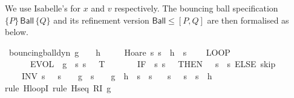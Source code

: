 \documentclass[envcountsame]{llncs}
\begin{document}
\begin{example}
We use Isabelle's  for $x$ and $v$ respectively. The bouncing ball specification $\{P\}\, \mathsf{Ball}\, \{Q\}$ and its refinement version $\mathsf{Ball}\leq [P,Q]$ are then formalised as below. 
\begin{isabellebody}
\isanewline
{}\isamarkupfalse%
\ bouncing{\isacharunderscore}ball{\isacharunderscore}dyn{\isacharcolon}\ {\isachardoublequoteopen}g\ {\isacharless}\ {}\ {\isasymLongrightarrow}\ h\ {\isasymge}\ {}\ {\isasymLongrightarrow}\isanewline
\ \ Hoare\ {\isasymlceil}{\isasymlambda}s{\isachardot}\ s{\isachardollar}{}\ {\isacharequal}\ h\ {\isasymand}\ s{\isachardollar}{}\ {\isacharequal}\ {}{\isasymrceil}\isanewline
\ \ {\isacharparenleft}LOOP\ \isanewline
\ \ \ \ \ \ {\isacharparenleft}{\isacharparenleft}EVOL\ {\isacharparenleft}{\isasymphi}\ g{\isacharparenright}\ {\isacharparenleft}{\isasymlambda}\ s{\isachardot}\ s{\isachardollar}{}\ {\isasymge}\ {}{\isacharparenright}\ T{\isacharparenright}{\isacharsemicolon}\isanewline
\ \ \ \ \ \ \ {\isacharparenleft}IF\ {\isacharparenleft}{\isasymlambda}\ s{\isachardot}\ s{\isachardollar}{}\ {\isacharequal}\ {}{\isacharparenright}\ THEN\ {\isacharparenleft}{}\ {\isacharcolon}{\isacharcolon}{\isacharequal}\ {\isacharparenleft}{\isasymlambda}s{\isachardot}\ {\isacharminus}\ s{\isachardollar}{}{\isacharparenright}{\isacharparenright}\ ELSE\ skip{\isacharparenright}{\isacharparenright}\ \isanewline
\ \ \ \ INV\ {\isacharparenleft}{\isasymlambda}s{\isachardot}\ {}\ {\isasymle}\ s{\isachardollar}{}\ {\isasymand}\ {}\ {\isasymcdot}\ g\ {\isasymcdot}\ s{\isachardollar}{}\ {\isacharequal}\ {}\ {\isasymcdot}\ g\ {\isasymcdot}\ h\ {\isacharplus}\ s{\isachardollar}{}\ {\isasymcdot}\ s{\isachardollar}{}{\isacharparenright}\isanewline
\ \ {\isacharparenright}\ {\isasymlceil}{\isasymlambda}s{\isachardot}\ {}\ {\isasymle}\ s{\isachardollar}{}\ {\isasymand}\ s{\isachardollar}{}\ {\isasymle}\ h{\isasymrceil}{\isachardoublequoteclose}\isanewline
\ \isamarkupfalse%
{\isacharparenleft}rule\ H{\isacharunderscore}loopI{\isacharcomma}\ rule\ H{\isacharunderscore}seq{\isacharbrackleft}\ R{\isacharequal}{\isachardoublequoteopen}I\ g{\isachardoublequoteclose}{\isacharbrackright}{\isacharparenright}\ \isamarkupfalse%

\end{isabellebody}
\end{example}
\end{document}
